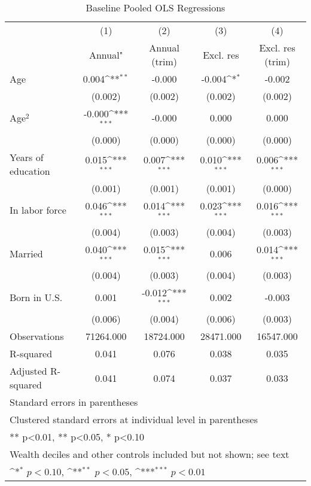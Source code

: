 \begin{table}[htbp]\centering
\def\sym#1{\ifmmode^{#1}\else\(^{#1}\)\fi}
\caption{Baseline Pooled OLS Regressions}
\begin{tabular}{l*{4}{c}}
\toprule
          &\multicolumn{1}{c}{(1)}&\multicolumn{1}{c}{(2)}&\multicolumn{1}{c}{(3)}&\multicolumn{1}{c}{(4)}\\
          &\multicolumn{1}{c}{Annual"}&\multicolumn{1}{c}{Annual (trim)}&\multicolumn{1}{c}{Excl. res}&\multicolumn{1}{c}{Excl. res (trim)}\\
\midrule
Age       &    0.004\sym{**} &   -0.000         &   -0.004\sym{*}  &   -0.002         \\
          &  (0.002)         &  (0.002)         &  (0.002)         &  (0.002)         \\
Age$^{2}$ &   -0.000\sym{***}&   -0.000         &    0.000         &    0.000         \\
          &  (0.000)         &  (0.000)         &  (0.000)         &  (0.000)         \\
Years of education&    0.015\sym{***}&    0.007\sym{***}&    0.010\sym{***}&    0.006\sym{***}\\
          &  (0.001)         &  (0.001)         &  (0.001)         &  (0.000)         \\
In labor force&    0.046\sym{***}&    0.014\sym{***}&    0.023\sym{***}&    0.016\sym{***}\\
          &  (0.004)         &  (0.003)         &  (0.004)         &  (0.003)         \\
Married   &    0.040\sym{***}&    0.015\sym{***}&    0.006         &    0.014\sym{***}\\
          &  (0.004)         &  (0.003)         &  (0.004)         &  (0.003)         \\
Born in U.S.&    0.001         &   -0.012\sym{***}&    0.002         &   -0.003         \\
          &  (0.006)         &  (0.004)         &  (0.006)         &  (0.003)         \\
\midrule
Observations&71264.000         &18724.000         &28471.000         &16547.000         \\
R-squared &    0.041         &    0.076         &    0.038         &    0.035         \\
Adjusted R-squared&    0.041         &    0.074         &    0.037         &    0.033         \\
\bottomrule
\multicolumn{5}{l}{\footnotesize Standard errors in parentheses}\\
\multicolumn{5}{l}{\footnotesize Clustered standard errors at individual level in parentheses}\\
\multicolumn{5}{l}{\footnotesize *** p<0.01, ** p<0.05, * p<0.10}\\
\multicolumn{5}{l}{\footnotesize Wealth deciles and other controls included but not shown; see text}\\
\multicolumn{5}{l}{\footnotesize \sym{*} \(p<0.10\), \sym{**} \(p<0.05\), \sym{***} \(p<0.01\)}\\
\end{tabular}
\end{table}
